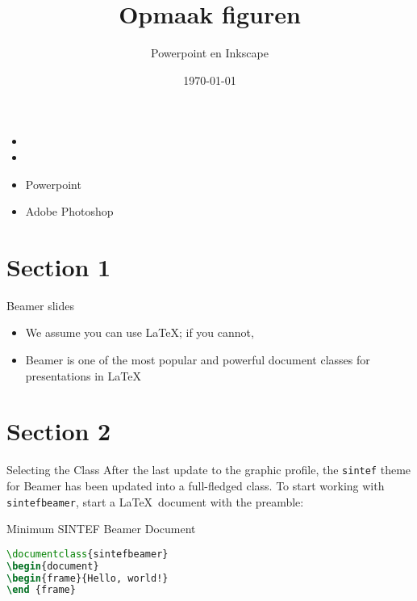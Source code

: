 \documentclass{sintefbeamer}
\title{Opmaak figuren}
\subtitle{Powerpoint en Inkscape}
\author{\href{j.busink@vu.nl}{}}
\date{\today}
\begin{document}
\maketitle

\begin{frame}
\begin{itemize}
      \item {} 
      \item {} 
      \item Powerpoint
      \item Adobe Photoshop
\end{itemize}

\end{frame}

\section{Section 1}

\begin{frame}{Beamer slides}{\thesection \, \secname}

\begin{itemize}
\item We assume you can use \LaTeX; if you cannot,
\item Beamer is one of the most popular and powerful document
classes for presentations in \LaTeX
\end{itemize}
\end{frame}

\section{Section 2}

\begin{frame}[fragile]{Selecting the Class}
After the last update to the graphic profile, the \texttt{sintef} theme for
Beamer has been updated into a full-fledged class.
To start working with \texttt{sintefbeamer}, start a \LaTeX\ document with the
preamble:
\begin{block}{Minimum SINTEF Beamer Document}
\begin{lstlisting}[language=TeX]
\documentclass{sintefbeamer}
\begin{document}
\begin{frame}{Hello, world!}
\end {frame}
\end{lstlisting}
\end{block}
\end{frame}
\end{document}
